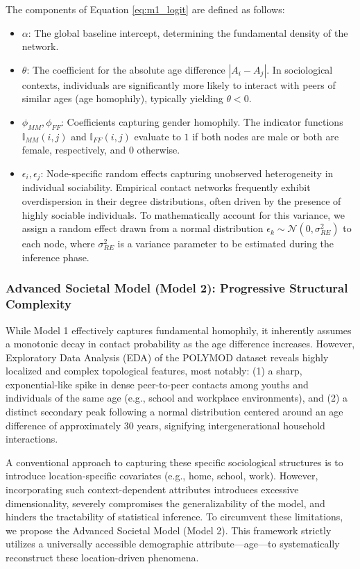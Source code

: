 The components of Equation \ref{eq:m1_logit} are defined as follows:
\begin{itemize}
    \item $\alpha$: The global baseline intercept, determining the fundamental density of the network.
    \item $\theta$: The coefficient for the absolute age difference $|A_i - A_j|$. In sociological contexts, individuals are significantly more likely to interact with peers of similar ages (age homophily), typically yielding $\theta < 0$.
    \item $\phi_{MM}, \phi_{FF}$: Coefficients capturing gender homophily.
    The indicator functions $\mathbb{I}_{MM}(i, j)$ and $\mathbb{I}_{FF}(i, j)$ evaluate to $1$ if both nodes are male or both are female, respectively, and $0$ otherwise.
    \item $\epsilon_i, \epsilon_j$: Node-specific random effects capturing unobserved heterogeneity in individual sociability. Empirical contact networks frequently exhibit overdispersion in their degree distributions, often driven by the presence of highly sociable individuals.
    To mathematically account for this variance, we assign a random effect drawn from a normal distribution $\epsilon_k \sim \mathcal{N}(0, \sigma_{RE}^2)$ to each node, where $\sigma_{RE}^2$ is a variance parameter to be estimated during the inference phase.
\end{itemize}

\subsubsection{Advanced Societal Model (Model 2): Progressive Structural Complexity}
While Model 1 effectively captures fundamental homophily, it inherently assumes a monotonic decay in contact probability as the age difference increases.
However, Exploratory Data Analysis (EDA) of the POLYMOD dataset \textcite{mossong2008social} reveals highly localized and complex topological features, most notably: (1) a sharp, exponential-like spike in dense peer-to-peer contacts among youths and individuals of the same age (e.g., school and workplace environments), and (2) a distinct secondary peak following a normal distribution centered around an age difference of approximately 30 years, signifying intergenerational household interactions.

A conventional approach to capturing these specific sociological structures is to introduce location-specific covariates (e.g., home, school, work).
However, incorporating such context-dependent attributes introduces excessive dimensionality, severely compromises the generalizability of the model, and hinders the tractability of statistical inference.
To circumvent these limitations, we propose the Advanced Societal Model (Model 2). This framework strictly utilizes a universally accessible demographic attribute---age---to systematically reconstruct these location-driven phenomena. 

